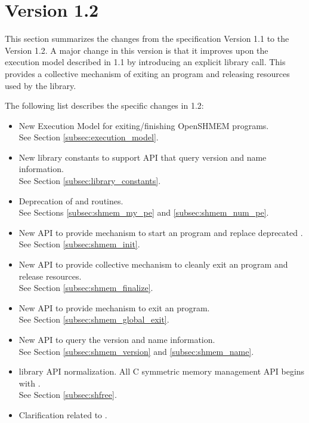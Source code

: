 \section{Version 1.2}
This section summarizes the changes from the \openshmem specification Version 1.1 to the Version 1.2.  
A major change in this version is that it improves upon the execution model described in 1.1 by introducing an explicit  library call. This provides a collective mechanism of exiting an \openshmem program and releasing resources used by the library.  



The following list describes the specific changes in 1.2:
\begin{itemize}
\item New Execution Model for exiting/finishing OpenSHMEM programs.
\\See Section  \ref{subsec:execution_model}.
\item New library constants to support API that query version and name information.
\\See Section \ref{subsec:library_constants}.
\item Deprecation of  and  routines.
\\See Sections \ref{subsec:shmem_my_pe} and \ref{subsec:shmem_num_pe}.
\item New API  to provide mechanism to start an \openshmem program and replace deprecated .
\\See Section \ref{subsec:shmem_init}.
\item New API  to provide collective mechanism to cleanly exit an \openshmem program and release resources.
\\See Section \ref{subsec:shmem_finalize}.
\item New API  to provide mechanism to exit an \openshmem program.
\\See Section \ref{subsec:shmem_global_exit}.
\item New API to query the version and name information. 
\\See Section \ref{subsec:shmem_version} and \ref{subsec:shmem_name}.
\item \openshmem library API normalization. All C symmetric memory management API begins with  .
\\See Section \ref{subsec:shfree}.
\item Clarification related to .

\end{itemize}
